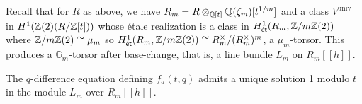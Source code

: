 Recall that for $R$ as above, we have $R_{m}=R\otimes_{\mathbb{Q}[t]}\mathbb{Q}(\zeta_{m})[t^{1/m}]$ and a class $V^{\mathrm{univ}}$ in $H^{1}(\mathbb{Z}(2)(R/\mathbb{Z}[t]))$ whose \'{e}tale realization is a class in $H^{1}_{\mathsf{\acute{e}t}}(R_{m},\mathbb{Z}/m\mathbb{Z}(2))$ where $\mathbb{Z}/m\mathbb{Z}(2)\cong\mu_{m}$ so $H^{1}_{\mathsf{\acute{e}t}}(R_{m},\mathbb{Z}/m\mathbb{Z}(2))\cong R_{m}^{\times}/(R_{m}^{\times})^{m}$, a $\mu_{m}$-torsor. This produces a $\mathbb{G}_{m}$-torsor after base-change, that is, a line bundle $L_{m}$ on $R_{m}[[h]]$.
\begin{theorem}
    The $q$-difference equation defining $f_{a}(t,q)$ admits a unique solution 1 modulo $t$ in the module $L_{m}$ over $R_{m}[[h]]$. 
\end{theorem}